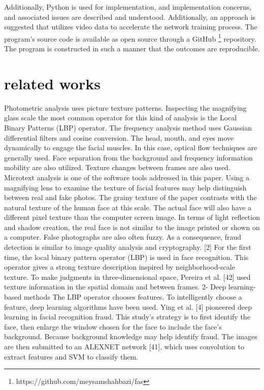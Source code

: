 \documentclass[journal]{IEEEtran}
\begin{document}
Additionally, Python is used for implementation, and implementation concerns, and associated issues are described and understood. Additionally, an approach is suggested that utilizes video data to accelerate the network training process. The program's source code is available as open source through a GitHub \footnote{https://github.com/meysamshahbazi/fas} repository. The program is constructed in such a manner that the outcomes are reproducible.
\section{related works}
Photometric analysis uses picture texture patterns. Inspecting the magnifying glass scale the most common operator for this kind of analysis is the Local Binary Patterns (LBP) operator.
The frequency analysis method uses Gaussian differential filters and cosine conversion.
The head, mouth, and eyes move dynamically to engage the facial muscles. In this case, optical flow techniques are generally used. Face separation from the background and frequency information mobility are also utilized. Texture changes between frames are also used.
Microtext analysis is one of the software tools addressed in this paper. Using a magnifying lens to examine the texture of facial features may help distinguish between real and fake photos. The grainy texture of the paper contrasts with the natural texture of the human face at this scale. The actual face will also have a different pixel texture than the computer screen image. In terms of light reflection and shadow creation, the real face is not similar to the image printed or shown on a computer. False photographs are also often fuzzy. As a consequence, fraud detection is similar to image quality analysis and cryptography.
[2] For the first time, the local binary pattern operator (LBP) is used in face recognition. This operator gives a strong texture description inspired by neighborhood-scale texture.
To make judgments in three-dimensional space, Pereira et al. [42] used texture information in the spatial domain and between frames.
2- Deep learning-based methods
The LBP operator chooses features. To intelligently choose a feature, deep learning algorithms have been used. Ying et al. [4] pioneered deep learning in facial recognition fraud. This study's strategy is to first identify the face, then enlarge the window chosen for the face to include the face's background. Because background knowledge may help identify fraud. The images are then submitted to an ALEXNET network [41], which uses convolution to extract features and SVM to classify them.
\end{document}
